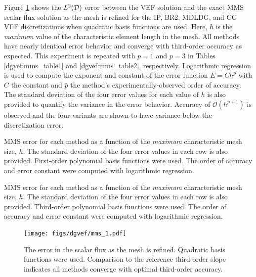 \documentclass[../doc.tex]{subfiles}
\begin{document}
Figure \ref{dgvef:mms_plot} shows the $L^2(\mathcal{D})$ error between the VEF solution and the exact MMS scalar flux solution as the mesh is refined for the IP, BR2, MDLDG, and CG VEF discretizations when quadratic basis functions are used. Here, $h$ is the \emph{maximum} value of the characteristic element length in the mesh. All methods have nearly identical error behavior and converge with third-order accuracy as expected. This experiment is repeated with $p=1$ and $p=3$ in Tables \ref{dgvef:mms_table1} and \ref{dgvef:mms_table2}, respectively. Logarithmic regression is used to compute the exponent and constant of the error function $E = C h^{\bar{p}}$ with $C$ the constant and $\bar{p}$ the method's experimentally-observed order of accuracy. The standard deviation of the four error values for each value of $h$ is also provided to quantify the variance in the error behavior. Accuracy of $\mathcal{O}(h^{p+1})$ is observed and the four variants are shown to have variance below the discretization error. 

\begin{table}
\centering
\caption{MMS error for each method as a function of the \emph{maximum} characteristic mesh size, $h$. The standard deviation of the four error values in each row is also provided. First-order polynomial basis functions were used. The order of accuracy and error constant were computed with logarithmic regression. }
\label{dgvef:mms_table1}

\end{table}

\begin{table}
\centering
\caption{MMS error for each method as a function of the \emph{maximum} characteristic mesh size, $h$. The standard deviation of the four error values in each row is also provided. Third-order polynomial basis functions were used. The order of accuracy and error constant were computed with logarithmic regression. }
\label{dgvef:mms_table2}

\end{table}

\begin{figure}
\centering
\texttt{[image: figs/dgvef/mms\_1.pdf]}
\caption{The error in the scalar flux as the mesh is refined. Quadratic basis functions were used. Comparison to the reference third-order slope indicates all methods converge with optimal third-order accuracy. }
\label{dgvef:mms_plot}
\end{figure}
\end{document}
